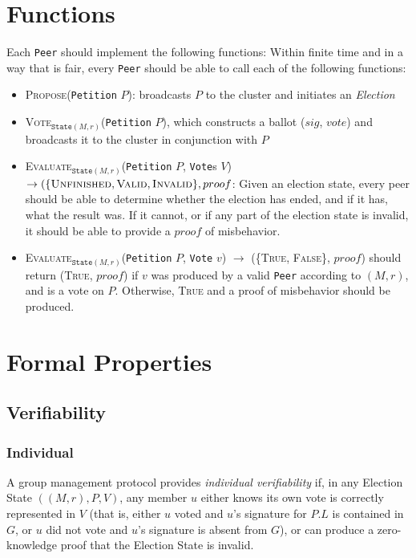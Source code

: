 \section{Functions}
Each \texttt{Peer} should implement the following functions:
Within finite time and in a way that is fair, every \texttt{Peer} should be able
to call each of the following functions:
\begin{itemize}
  \item \textsc{Propose}(\texttt{Petition} $P$): broadcasts $P$ to the cluster
    and initiates an \emph{Election}
  \item \textsc{Vote}$_{\texttt{State} (M, r)}$(\texttt{Petition} $P$), which
    constructs a ballot ($sig$, $vote$) and broadcasts it to the cluster in
    conjunction with $P$
  \item \textsc{Evaluate}$_{\texttt{State} (M,r)}$(\texttt{Petition} $P$,
    \texttt{Vote}s $V$) $\to (\{\textsc{Unfinished}, \textsc{Valid},
    \textsc{Invalid}\}, proof$: Given an election state, every peer
    should be able to determine whether the election has ended, and if it has,
    what the result was. If it cannot, or if any part of the election state is
    invalid, it should be able to provide a $proof$ of misbehavior.
  \item \textsc{Evaluate}$_{\texttt{State} (M,r)}$(\texttt{Petition}
    $P$, \texttt{Vote} $v$) $\to$ (\{\textsc{True, False}\}, $proof$) should
    return (\textsc{True}, $proof$) if $v$ was produced by a valid \texttt{Peer}
    according to $(M,r)$, and is a vote on $P$. Otherwise, \textsc{True} and a
    proof of misbehavior should be produced.
\end{itemize}

\section{Formal Properties}
  \subsection{Verifiability}\label{Subsection:verif}
    \subsubsection{Individual}
    A group management protocol provides \emph{individual verifiability} if, in
    any Election State $((M,r), P, V)$, any member $u$
    either knows its own vote is correctly represented in $V$ (that is, either
    $u$ voted and $u$'s
    signature for $P.L$ is contained in $G$,
    or $u$ did not vote and $u$'s signature is absent from $G$), or can produce
    a zero-knowledge proof that the Election State is invalid.

